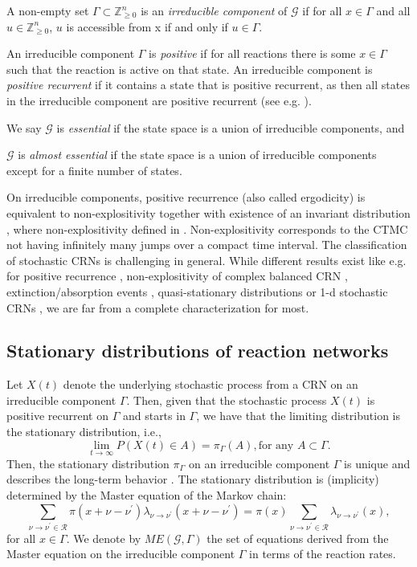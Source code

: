 \documentclass{amsart}
\theoremstyle{definition}
\theoremstyle{remark}
\theoremstyle{Conjecture/open problem}
\theoremstyle{assumption}
\theoremstyle{conjecture}
\def\la{\lambda}
\def\Ga{\Gamma}
\def\la{\lambda}
\def\p{^{\prime}}
\def\cG{\mathcal{G}}
\def\cR{\mathcal{R}}
\def\Z{\mathbb{Z}}
\numberwithin{equation}{section}
\begin{document}
 A non-empty set $\Ga\subset\Z_{\geq 0}^n$ is an \emph{irreducible component} of $\cG$ if for all $x\in \Ga$ and all $u\in  \Z_{\geq 0}^n$, $u$ is accessible from x if and only if $u\in \Ga$.

  An irreducible component $\Ga$ is \emph{positive} if for all reactions there is some $x\in \Ga$ such that the reaction is active on that state.
An irreducible component is \emph{positive recurrent} if it contains a state that is positive recurrent, as then all states in the irreducible component are positive recurrent (see e.g. \cite[Theorem 3.5.3]{norris}).
	
 We say $\cG$ is \emph{essential} if the state space is a union of irreducible components, and

 $\cG$ is \emph{almost essential} if the state space is a union of irreducible components except for a finite number of states.

  
On irreducible components, positive recurrence (also called ergodicity) is equivalent to non-explositivity together with existence of an invariant distribution \cite[Theorem 3.5.3]{norris}, where non-explositivity defined in \cite[Section 2.7]{norris}. Non-explositivity corresponds to the CTMC not having infinitely many jumps over a compact time interval. The classification of stochastic CRNs is challenging in general. While different results exist like e.g. for positive recurrence \cite{andersonpos},  non-explositivity of complex balanced CRN \cite{non-expl}, extinction/absorption events \cite{extinction,quasi_stat}, quasi-stationary distributions \cite{quasi_stat} or 1-d stochastic CRNs \cite{xu2019dynamics}, we are far from a complete characterization for most.

 

 
\subsection{Stationary distributions of reaction networks} \label{stat}
Let $X(t)$ denote the underlying stochastic process from a CRN on an irreducible component $\Ga$. Then, given that the stochastic process $X(t)$ is positive recurrent on $\Ga$ and starts in $\Ga$, we have that the limiting distribution is the stationary distribution, i.e.,
$$\lim_{t\to\infty}P(X(t)\in A)=\pi_\Ga(A),\text{for any } A\subset\Ga.$$
Then, the stationary distribution $\pi_\Ga$ on an irreducible component $\Ga$ is unique and describes the long-term behavior \cite[Theorem 3.6.3]{norris}.  The stationary distribution is (implicity) determined by the Master equation of the Markov chain:
\begin{equation} \label{master_eq1}
  \sum_{\nu\to\nu\p\in\cR} \pi(x+\nu-\nu\p)\la_{\nu \to \nu\p}(x+\nu -\nu\p)=\pi(x)\sum_{\nu\to\nu\p\in\cR}\la_{\nu \to \nu\p}(x),
  \end{equation}
for all $x\in\Ga$. We denote by $ME(\cG,\Ga)$ the set of equations derived from the Master equation on the irreducible component $\Ga$ in terms of the reaction rates.
\end{document}
